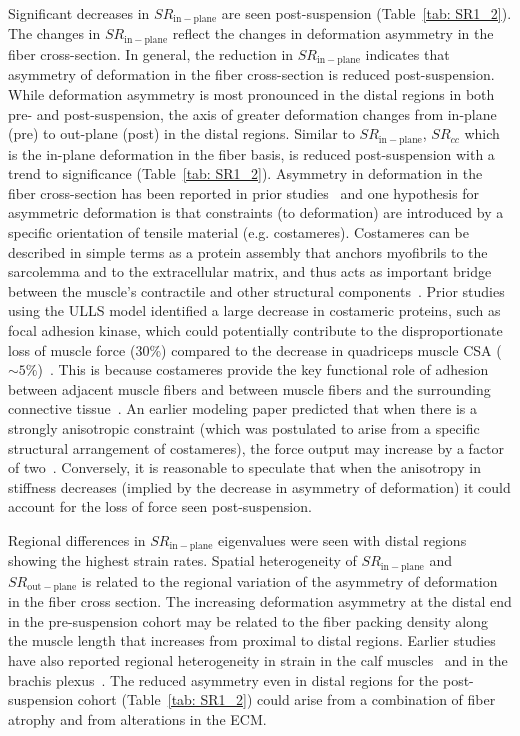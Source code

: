 Significant decreases in $SR_{\mathrm{in-plane}}$ are seen post-suspension (Table~\ref{tab: SR1_2}). 
The changes in $SR_{\mathrm{in-plane}}$ reflect the changes in deformation asymmetry in the fiber cross-section. 
In general, the reduction in $SR_{\mathrm{in-plane}}$ indicates that asymmetry of deformation in the fiber cross-section is reduced post-suspension. 
While deformation asymmetry is most pronounced in the distal regions in both pre- and post-suspension, the axis of greater deformation changes from in-plane (pre) to out-plane (post) in the distal regions. 
Similar to $SR_{\mathrm{in-plane}}$, $SR_{cc}$ which is the in-plane deformation in the fiber basis, is reduced post-suspension with a trend to significance (Table~\ref{tab: SR1_2}).
Asymmetry in deformation in the fiber cross-section has been reported in prior studies~\cite{RNS16, RNS31, RNS32} and one hypothesis for asymmetric deformation is that constraints (to deformation) are introduced by a specific orientation of tensile material (e.g. costameres). 
Costameres can be described in simple terms as a protein assembly that anchors myofibrils to the sarcolemma and to the extracellular matrix, and thus acts as important bridge between the muscle's contractile and other structural components~\cite{RNS33}.
Prior studies using the ULLS model identified a large decrease in costameric proteins, such as focal adhesion kinase, which could potentially contribute to the disproportionate loss of muscle force ($30\%$) compared to the decrease in quadriceps muscle CSA ($\sim 5\%$)~\cite{RNS8, RNS17}.
This is because costameres provide the key functional role of adhesion between adjacent muscle fibers and between muscle fibers and the surrounding connective tissue~\cite{RNS34}.
An earlier modeling paper predicted that when there is a strongly anisotropic constraint (which was postulated to arise from a specific structural arrangement of costameres), the force output may increase by a factor of two~\cite{RNS28}.
Conversely, it is reasonable to speculate that when the anisotropy in stiffness decreases (implied by the decrease in asymmetry of deformation) it could account for the loss of force seen post-suspension. 

Regional differences in $SR_{\mathrm{in-plane}}$ eigenvalues were seen with distal regions showing the highest strain rates.
Spatial heterogeneity of $SR_{\mathrm{in-plane}}$ and $SR_{\mathrm{out-plane}}$ is related to the regional variation of the asymmetry of deformation in the fiber cross section. 
The increasing deformation asymmetry at the distal end in the pre-suspension cohort may be related to the fiber packing density along the muscle length that increases from proximal to distal regions.
Earlier studies have also reported regional heterogeneity in strain in the calf muscles~\cite{RNS24} and in the brachis plexus~\cite{RNS35}.
The reduced asymmetry even in distal regions for the post-suspension cohort (Table~\ref{tab: SR1_2}) could arise from a combination of fiber atrophy and from alterations in the ECM. 

